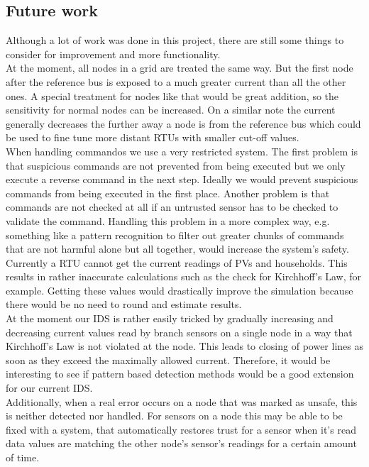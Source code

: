 \documentclass[conference]{IEEEtran}
\begin{document}
	\subsection{Future work}
		
		Although a lot of work was done in this project, there are still some things to consider for improvement and more functionality. \\
		At the moment, all nodes in a grid are treated the same way. But the first node after the reference bus is exposed to a much greater current than all the other ones. A special treatment for nodes like that would be great addition, so the sensitivity for normal nodes can be increased. On a similar note the current generally decreases the further away a node is from the reference bus which could be used to fine tune more distant RTUs with smaller cut-off values. \\
		When handling commandos we use a very restricted system. The first problem is that suspicious commands are not prevented from being executed but we only execute a reverse command in the next step. Ideally we would prevent suspicious commands from being executed in the first place. Another problem is that commands are not checked at all if an untrusted sensor has to be checked to validate the command. Handling this problem in a more complex way, e.g. something like a pattern recognition to filter out greater chunks of commands that are not harmful alone but all together, would increase the system's safety. \\
		Currently a RTU cannot get the current readings of PVs and households. This results in rather inaccurate calculations such as the check for Kirchhoff's Law, for example. Getting these values would drastically improve the simulation because there would be no need to round and estimate results. \\
		At the moment our IDS is rather easily tricked by gradually increasing and decreasing current values read by branch sensors on a single node in a way that Kirchhoff's Law is not violated at the node. This leads to closing of power lines as soon as they exceed the maximally allowed current. Therefore, it would be interesting to see if pattern based detection methods would be a good extension for our current IDS. \\
		Additionally, when a real error occurs on a node that was marked as unsafe, this is neither detected nor handled. For sensors on a node this may be able to be fixed with a system, that automatically restores trust for a sensor when it's read data values are matching the other node's sensor's readings for a certain amount of time. \\
\end{document}
